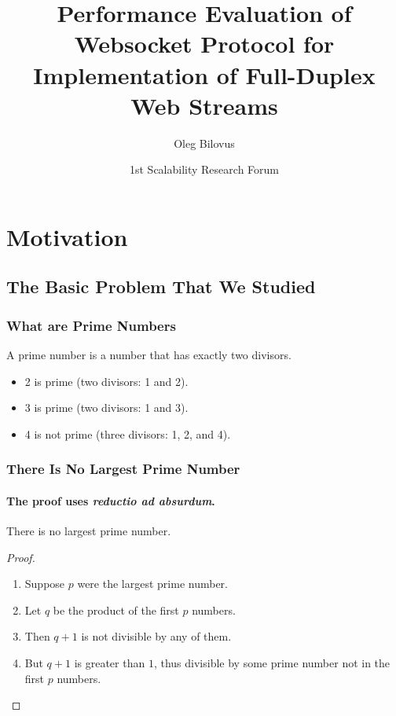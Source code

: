 \documentclass{beamer}
\title[Websocket]{Performance Evaluation of Websocket Protocol for Implementation of Full-Duplex Web Streams}
\author{Oleg Bilovus}
\institute{Università degli Studi di Salerno}
\date[SRF 1st]{1st Scalability Research Forum}
\begin{document}
\begin{frame}
    \titlepage

\end{frame}


\section{Motivation}
\subsection{The Basic Problem That We Studied}

\begin{frame}
    \frametitle{What are Prime Numbers}
    \begin{definition}
        A \alert{prime number} is a number that has exactly two divisors.
    \end{definition}
    \pause
    \begin{example}
        \begin{itemize}
            \item<2-> 2 is prime (two divisors: 1 and 2).

            \item<3-> 3 is prime (two divisors: 1 and 3).

            \item<4-> 4 is not prime (\alert{three} divisors: 1, 2, and 4).
        \end{itemize}
    \end{example}
\end{frame}

\begin{frame}
    \frametitle{There Is No Largest Prime Number}
    \framesubtitle{The proof uses \textit{reductio ad absurdum}.}
    \begin{theorem}
        There is no largest prime number.
    \end{theorem}
    \begin{proof}
        \begin{enumerate}
            \item<1-> Suppose $p$ were the largest prime number.

            \item<2-> Let $q$ be the product of the first $p$ numbers.

            \item<3-> Then $q + 1$ is not divisible by any of them.

            \item<1-> But $q + 1$ is greater than $1$, thus divisible by some prime
                number not in the first $p$ numbers.\qedhere
        \end{enumerate}
    \end{proof}
\end{frame}
\end{document}
